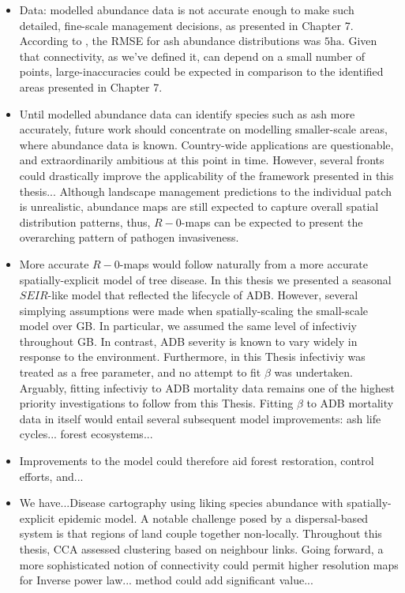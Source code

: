 \begin{itemize}
    \item Data: modelled abundance data is not accurate enough to make such detailed, fine-scale management decisions, as presented in Chapter 7. According to \cite{hill.data},
    the RMSE for ash abundance distributions was $5\mathrm{ha}$. Given that connectivity, as we've defined it, can depend on a small number of points,
    large-inaccuracies could be expected in comparison to the identified areas presented in Chapter 7.
    \item Until modelled abundance data can identify species such as ash more accurately, future work should concentrate on modelling smaller-scale areas, 
    where abundance data is known. Country-wide applications are questionable, and extraordinarily ambitious at this point in time. However, several fronts could drastically improve the applicability of the framework presented in this thesis...
    \itme Although landscape management predictions to the individual patch is unrealistic, abundance maps are still expected to capture overall spatial distribution patterns,
    thus, $R-0$-maps can be expected to present the overarching pattern of pathogen invasiveness.
    \item More accurate $R-0$-maps would follow naturally from a more accurate spatially-explicit model of tree disease. In this thesis we presented a seasonal $SEIR$-like model 
    that reflected the lifecycle of ADB. However, several simplying assumptions were made when spatially-scaling the small-scale model over GB.
    In particular, we assumed the same level of infectiviy throughout GB. In contrast, ADB severity is known to vary widely in response to the environment.
    Furthermore, in this Thesis infectiviy was treated as a free parameter, and no attempt to fit $\beta$ was undertaken.
    Arguably, fitting infectiviy to ADB mortality data remains one of the highest priority investigations to follow from this Thesis.
    Fitting $\beta$ to ADB mortality data in itself would entail several subsequent model improvements: ash life cycles... forest ecosystems...
    \item Improvements to the model could therefore aid forest restoration, control efforts, and...
    \item We have...Disease cartography using liking species abundance with spatially-explicit epidemic model. A notable challenge posed by a dispersal-based system
    is that regions of land couple together non-locally. Throughout this thesis, CCA assessed clustering based on neighbour links. 
    Going forward, a more sophisticated notion of connectivity could permit higher resolution maps for Inverse power law... method could add significant value... 
    
\end{itemize}